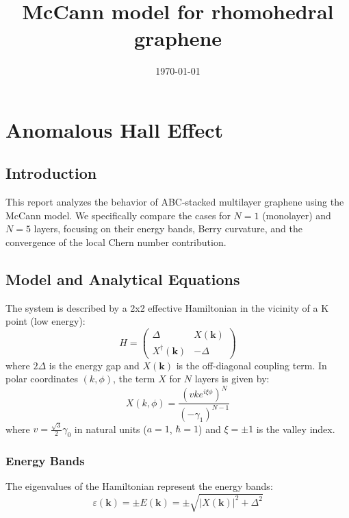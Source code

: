 \documentclass[11pt,a4paper]{report}
\title{McCann model for rhomohedral graphene}
\date{\today}
\begin{document}
\maketitle

\chapter{Anomalous Hall Effect}

\section{Introduction}
This report analyzes the behavior of ABC-stacked multilayer graphene using the McCann model. We specifically compare the cases for $N=1$ (monolayer) and $N=5$ layers, focusing on their energy bands, Berry curvature, and the convergence of the local Chern number contribution.

\section{Model and Analytical Equations}
The system is described by a 2x2 effective Hamiltonian in the vicinity of a K point (low energy):
\begin{equation}
H = \begin{pmatrix}
\Delta & X(\mathbf{k}) \\
X^\dagger(\mathbf{k}) & -\Delta
\end{pmatrix}
\end{equation}
where $2\Delta$ is the energy gap and $X(\mathbf{k})$ is the off-diagonal coupling term. In polar coordinates $(k, \phi)$, the term $X$ for $N$ layers is given by:
\begin{equation}
X(k, \phi) = \frac{(v k e^{i \xi \phi})^N}{(-\gamma_1)^{N-1}}
\end{equation}
where $v = \frac{\sqrt{3}}{2} \gamma_0$ in natural units ($a=1$, $\hbar=1$) and $\xi = \pm 1$ is the valley index.

\subsection{Energy Bands}
The eigenvalues of the Hamiltonian represent the energy bands:
\begin{equation}
\varepsilon(\mathbf{k}) = \pm E(\mathbf{k}) = \pm \sqrt{|X(\mathbf{k})|^2 + \Delta^2}
\end{equation}
\end{document}

